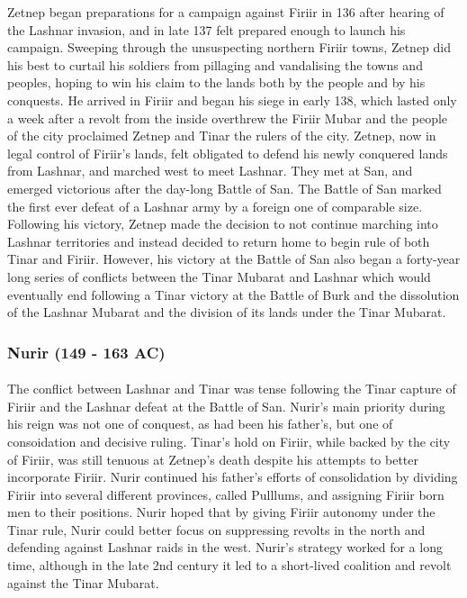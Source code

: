 Zetnep began preparations for a campaign against Firiir in 136 after hearing of the Lashnar invasion, and in late 137 felt prepared enough to launch his campaign. Sweeping through the unsuspecting northern Firiir towns, Zetnep did his best to curtail his soldiers from pillaging and vandalising the towns and peoples, hoping to win his claim to the lands both by the people and by his conquests. He arrived in Firiir and began his siege in early 138, which lasted only a week after a revolt from the inside overthrew the Firiir Mubar and the people of the city proclaimed Zetnep and Tinar the rulers of the city. Zetnep, now in legal control of Firiir's lands, felt obligated to defend his newly conquered lands from Lashnar, and marched west to meet Lashnar. They met at San, and emerged victorious after the day-long Battle of San. The Battle of San marked the first ever defeat of a Lashnar army by a foreign one of comparable size. Following his victory, Zetnep made the decision to not continue marching into Lashnar territories and instead decided to return home to begin rule of both Tinar and Firiir. However, his victory at the Battle of San also began a forty-year long series of conflicts between the Tinar Mubarat and Lashnar which would eventually end following a Tinar victory at the Battle of Burk and the dissolution of the Lashnar Mubarat and the division of its lands under the Tinar Mubarat.
\subsubsection{Nurir (149 - 163 AC)}
\paragraph{}
The conflict between Lashnar and Tinar was tense following the Tinar capture of Firiir and the Lashnar defeat at the Battle of San. Nurir's main priority during his reign was not one of conquest, as had been his father's, but one of consoidation and decisive ruling. Tinar's hold on Firiir, while backed by the city of Firiir, was still tenuous at Zetnep's death despite his attempts to better incorporate Firiir. Nurir continued his father's efforts of consolidation by dividing Firiir into several different provinces, called Pulllums, and assigning Firiir born men to their positions. Nurir hoped that by giving Firiir autonomy under the Tinar rule, Nurir could better focus on suppressing revolts in the north and defending against Lashnar raids in the west. Nurir's strategy worked for a long time, although in the late 2nd century it led to a short-lived coalition and revolt against the Tinar Mubarat. 


